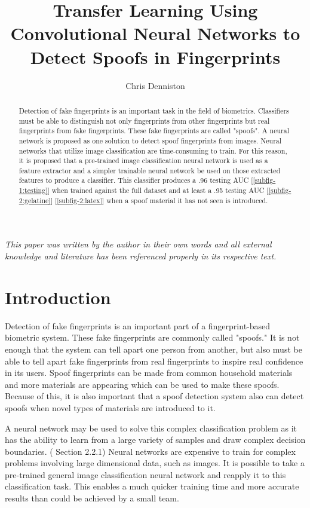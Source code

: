 \documentclass[]{article}
\title{Transfer Learning Using Convolutional Neural Networks to Detect Spoofs in Fingerprints}
\author{Chris Denniston}
\begin{document}
\maketitle
\textit{This paper was written by the author in their own words and all external knowledge and literature has been referenced properly in its respective text.}
\begin{abstract}
Detection of fake fingerprints is an important task in the field of biometrics. Classifiers must be able to distinguish not only fingerprints from other fingerprints but real fingerprints from fake fingerprints. These fake fingerprints are called "spoofs". A neural network is proposed as one solution to detect spoof fingerprints from images. Neural networks that utilize image classification are time-consuming to train. For this reason, it is proposed that a pre-trained image classification neural network is used as a feature extractor and a simpler trainable neural network be used on those extracted features to produce a classifier. This classifier produces a .96 testing AUC [\ref{subfig-1:testing}] when trained against the full dataset and at least a .95 testing AUC [\ref{subfig-2:gelatine}] [\ref{subfig-2:latex}] when a spoof material it has not seen is introduced.
\end{abstract}

\section{Introduction}
Detection of fake fingerprints is an important part of a fingerprint-based biometric system. These fake fingerprints are commonly called "spoofs." It is not enough that the system can tell apart one person from another, but also must be able to tell apart fake fingerprints from real fingerprints to inspire real confidence in its users. Spoof fingerprints can be made from common household materials and more materials are appearing which can be used to make these spoofs. Because of this, it is also important that a spoof detection system also can detect spoofs when novel types of materials are introduced to it. 

A neural network may be used to solve this complex classification problem as it has the ability to learn from a large variety of samples and draw complex decision boundaries. (\cite{book} Section 2.2.1)  Neural networks are expensive to train for complex problems involving large dimensional data, such as images. It is possible to take a pre-trained general image classification neural network and reapply it to this classification task. This enables a much quicker training time and more accurate results than could be achieved by a small team. 
\end{document}
